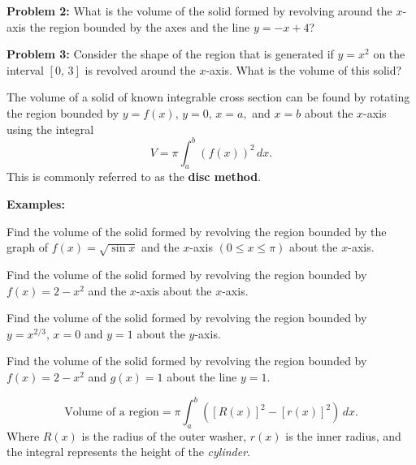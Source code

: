 \documentclass[addpoints, 12pt]{exam}
\begin{document}
\textbf{Problem 2:} What is the volume of the solid formed by revolving around the $x$-axis the region bounded by the axes and the line $y=-x+4$?

\textbf{Problem 3:} Consider the shape of the region that is generated if $y=x^2$ on the interval $[0,\,3]$ is revolved around the $x$-axis. What is the volume of this solid?

\newpage


\begin{tcolorbox}[title= VOLUME OF A SOLID OF REVOLUTION, black,sharp corners,colback=white,colbacktitle=white,coltitle=black,boxrule=1pt]

     The volume of a solid of known integrable cross section can be found by rotating the region bounded by $y=f(x),\,y=0,\,x=a,$ and $x=b$ about the $x$-axis using the integral
     \[V=\pi\int_a^b\left(f(x)\right)^2\,dx.\]
     This is commonly referred to as the \textbf{disc method}.
    
\end{tcolorbox}
\textbf{Examples:}
\begin{questions}
    \question Find the volume of the solid formed by revolving the region bounded by the graph of $f(x)=\sqrt{\sin x}$ and the $x$-axis $\left(0\le x\le\pi\right)$ about the $x$-axis.
    
    \question Find the volume of the solid formed by revolving the region bounded by $f(x)=2-x^2$ and the $x$-axis about the $x$-axis.
    
    \question Find the volume of the solid formed by revolving the region bounded by $y=x^{2/3},\, x=0$ and $y=1$ about the $y$-axis.
    
    \newpage
    
    \question Find the volume of the solid formed by revolving the region bounded by $f(x)=2-x^2$ and $g(x)=1$ about the line $y=1$.

\end{questions}

\begin{tcolorbox}[title= VOLUME OF A REGION USING WASHERS, black,sharp corners,colback=white,colbacktitle=white,coltitle=black,boxrule=1pt]

     \[\text{Volume of a region}=\pi\int_a^b\left(\left[R(x)\right]^2-\left[r(x)\right]^2\right)\,dx.\]
     Where $R(x)$ is the radius of the outer washer, $r(x)$ is the inner radius, and the integral represents the height of the \textit{cylinder}.
    
\end{tcolorbox}
\end{document}
